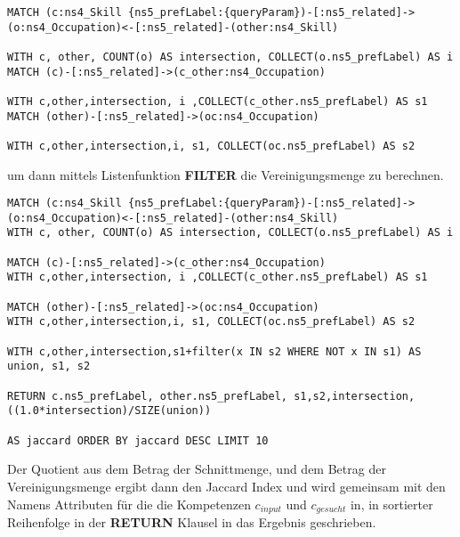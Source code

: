 \begin{lstlisting}
MATCH (c:ns4_Skill {ns5_prefLabel:{queryParam})-[:ns5_related]->(o:ns4_Occupation)<-[:ns5_related]-(other:ns4_Skill)

WITH c, other, COUNT(o) AS intersection, COLLECT(o.ns5_prefLabel) AS i
MATCH (c)-[:ns5_related]->(c_other:ns4_Occupation)

WITH c,other,intersection, i ,COLLECT(c_other.ns5_prefLabel) AS s1
MATCH (other)-[:ns5_related]->(oc:ns4_Occupation)

WITH c,other,intersection,i, s1, COLLECT(oc.ns5_prefLabel) AS s2

\end{lstlisting}

um dann mittels Listenfunktion \textbf{FILTER} die Vereinigungsmenge zu berechnen.

\begin{lstlisting}[language=SPARQL, morekeywords={MATCH, WITH, COLLECT}]
MATCH (c:ns4_Skill {ns5_prefLabel:{queryParam})-[:ns5_related]->(o:ns4_Occupation)<-[:ns5_related]-(other:ns4_Skill)
WITH c, other, COUNT(o) AS intersection, COLLECT(o.ns5_prefLabel) AS i

MATCH (c)-[:ns5_related]->(c_other:ns4_Occupation)
WITH c,other,intersection, i ,COLLECT(c_other.ns5_prefLabel) AS s1

MATCH (other)-[:ns5_related]->(oc:ns4_Occupation)
WITH c,other,intersection,i, s1, COLLECT(oc.ns5_prefLabel) AS s2

WITH c,other,intersection,s1+filter(x IN s2 WHERE NOT x IN s1) AS union, s1, s2

RETURN c.ns5_prefLabel, other.ns5_prefLabel, s1,s2,intersection,((1.0*intersection)/SIZE(union)) 

AS jaccard ORDER BY jaccard DESC LIMIT 10

\end{lstlisting}


Der Quotient aus dem Betrag der Schnittmenge, und dem Betrag der Vereinigungsmenge ergibt dann den Jaccard Index und wird gemeinsam mit den Namens Attributen für die die Kompetenzen $c_{input}$ und $c_{gesucht}$  in, in sortierter Reihenfolge in der \textbf{RETURN} Klausel in das Ergebnis geschrieben.

